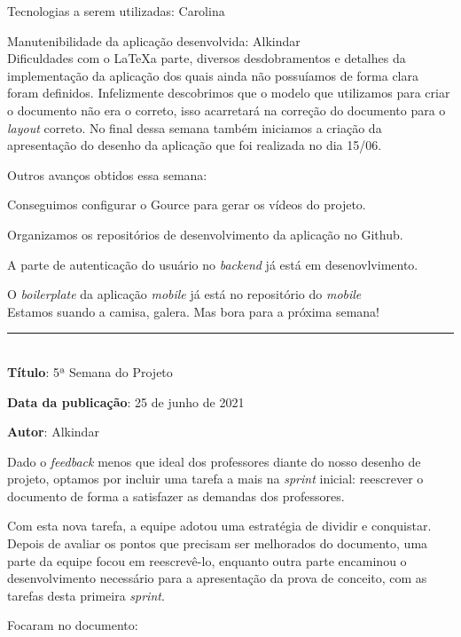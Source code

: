 Tecnologias a serem utilizadas: Carolina

Manutenibilidade da aplicação desenvolvida: Alkindar \\



Dificuldades com o \LaTeX \space a parte, diversos desdobramentos e detalhes da implementação da aplicação dos quais ainda não possuíamos de forma clara foram definidos. Infelizmente descobrimos que o modelo que utilizamos para criar o documento não era o correto, isso acarretará na correção do documento para o \textit{layout} correto. No final dessa semana também iniciamos a criação da apresentação do desenho da aplicação que foi realizada no dia 15/06.

Outros avanços obtidos essa semana:

Conseguimos configurar o Gource para gerar os vídeos do projeto. 

Organizamos os repositórios de desenvolvimento da aplicação no Github. 

A parte de autenticação do usuário no \textit{\gls{backend}} já está em desenovlvimento.

O \textit{boilerplate} da aplicação \textit{mobile} já está no repositório do \textit{mobile}\\



Estamos suando a camisa, galera. Mas bora para a próxima semana! \\

\protect\rule{13cm}{.5pt}
\\

\textbf{Título}: 5ª Semana do Projeto

\textbf{Data da publicação}: 25 de junho de 2021

\textbf{Autor}: Alkindar

Dado o \textit{feedback} menos que ideal dos professores diante do nosso desenho de projeto, optamos por incluir uma tarefa a mais na \textit{\gls{sprint}} inicial: reescrever o documento de forma a satisfazer as demandas dos professores.

Com esta nova tarefa, a equipe adotou uma estratégia de dividir e conquistar. Depois de avaliar os pontos que precisam ser melhorados do documento, uma parte da equipe focou em reescrevê-lo, enquanto outra parte encaminou o desenvolvimento necessário para a apresentação da prova de conceito, com as tarefas desta primeira \textit{\gls{sprint}}.

Focaram no documento:

